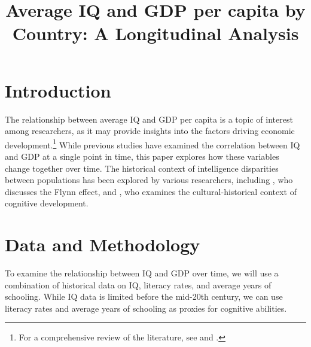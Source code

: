 \documentclass{article}
\begin{document}
\title{Average IQ and GDP per capita by Country: A Longitudinal Analysis}
\author{}
\date{}
\maketitle

\section{Introduction}

The relationship between average IQ and GDP per capita is a topic of interest among researchers, as it may provide insights into the factors driving economic development.\footnote{For a comprehensive review of the literature, see \cite{LynnVanhanen2012} and \cite{Rindermann2018}.} While previous studies have examined the correlation between IQ and GDP at a single point in time, this paper explores how these variables change together over time. The historical context of intelligence disparities between populations has been explored by various researchers, including \cite{flynn2012are}, who discusses the Flynn effect, and \cite{cole1995cultural}, who examines the cultural-historical context of cognitive development.

\section{Data and Methodology}

To examine the relationship between IQ and GDP over time, we will use a combination of historical data on IQ, literacy rates, and average years of schooling. While IQ data is limited before the mid-20th century, we can use literacy rates and average years of schooling as proxies for cognitive abilities.
\end{document}
